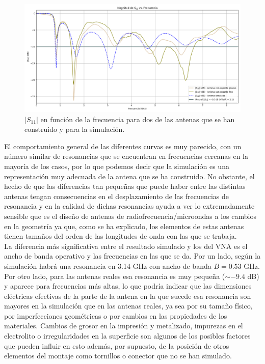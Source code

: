 \documentclass[11pt,a4paper,twoside,pdf]{article}
\numberwithin{equation}{section}
\begin{document}
\begin{figure}[!h]
    \centering
    \includegraphics[width=\linewidth]{img/S11_todos.png}
    \vspace{-0.5cm}
    \caption{$|S_{11}|$ en función de la frecuencia para dos de las antenas que se han construido y para la simulación.}
    \label{fig:comparacionResultados}
\end{figure}
El comportamiento general de las diferentes curvas es muy parecido, con un número similar de resonancias que se encuentran en frecuencias cercanas en la mayoría de los casos, por lo que podemos decir que la simulación es una representación muy adecuada de la antena que se ha construido. No obstante, el hecho de que las diferencias tan pequeñas que puede haber entre las distintas antenas tengan consecuencias en el desplazamiento de las frecuencias de resonancia y en la calidad de dichas resonancias ayuda a ver lo extremadamente sensible que es el diseño de antenas de radiofrecuencia/microondas a los cambios en la geometría ya que, como se ha explicado, los elementos de estas antenas tienen tamaños del orden de las longitudes de onda con las que se trabaja.\\

La diferencia más significativa entre el resultado simulado y los del VNA es el ancho de banda operativo y las frecuencias en las que se da. Por un lado, según la simulación habrá una resonancia en 3.14 GHz con ancho de banda $B=0.53$ GHz. Por otro lado, para las antenas reales esa resonancia es muy pequeña ($\sim-9.4$ dB) y aparece para frecuencias más altas, lo que podría indicar que las dimensiones eléctricas efectivas de la parte de la antena en la que sucede esa resonancia son mayores en la simulación que en las antenas reales, ya sea por su tamaño físico, por imperfecciones geométricas o por cambios en las propiedades de los materiales. Cambios de grosor en la impresión y metalizado, impurezas en el electrolito o irregularidades en la superficie son algunos de los posibles factores que pueden influir en esto además, por supuesto, de la posición de otros elementos del montaje como tornillos o conector que no se han simulado.\\
\end{document}
